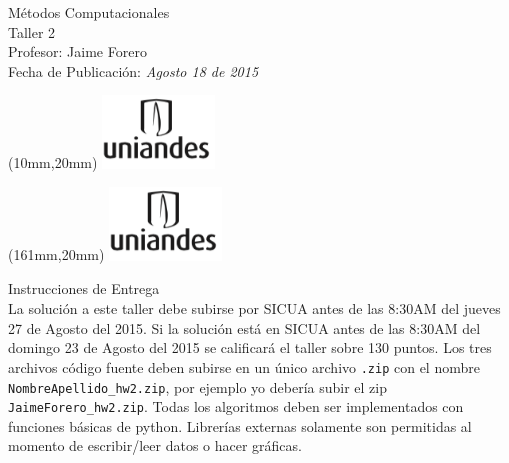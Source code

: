 \documentclass[11pt,letterpaper]{exam}
\begin{document}
\begin{center}
{\Large Métodos Computacionales} \\
Taller 2 \\
Profesor: Jaime Forero\\
Fecha de Publicación: {\small \it Agosto 18 de 2015}\\
\end{center}

\begin{textblock*}{40mm}(10mm,20mm)
  \includegraphics[width=3cm]{logoUniandes.png}
\end{textblock*}

\begin{textblock*}{40mm}(161mm,20mm)
  \includegraphics[width=3cm]{logoUniandes.png}
\end{textblock*}

\vspace{0.5cm}

{\Large Instrucciones de Entrega}\\

\noindent
La solución a este taller debe subirse por SICUA antes de las 8:30AM
del jueves 27 de Agosto del 2015. 
\noindent
Si la soluci\'on est\'a en SICUA
antes de las 8:30AM del domingo 23 de Agosto del 2015 se calificar\'a
el taller sobre 130 puntos. 
\noindent
Los tres archivos c\'odigo fuente deben subirse en un \'unico archivo
\verb".zip" con el nombre \verb"NombreApellido_hw2.zip", por ejemplo
yo deber\'ia subir el zip \verb"JaimeForero_hw2.zip".
\noindent
Todas los algoritmos deben ser implementados con funciones b\'asicas
de python. Librer\'ias externas solamente son permitidas al momento de
escribir/leer datos o hacer gr\'aficas.
\end{document}
